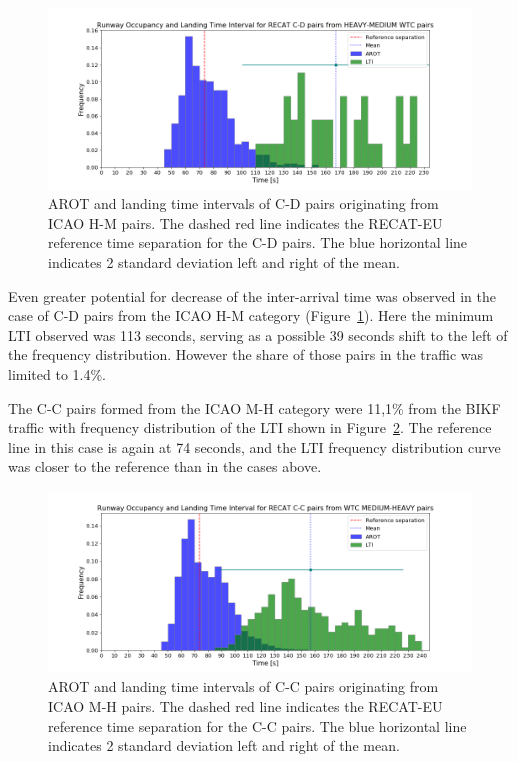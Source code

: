  \begin{figure}[h]
    \centering
    \includegraphics[width=1\textwidth]{graphics/fig_CD_from_HM_pairs_time_sep.png}
    \caption[AROT and LTI of C-D pairs originating from ICAO H-M pairs]{AROT and landing time intervals of C-D pairs originating from ICAO H-M pairs. The dashed red line indicates the RECAT-EU reference time separation for the C-D pairs. The blue horizontal line indicates 2 standard deviation left and right of the mean.}
    \label{fig:CD_from_HM_pairs_time_sep}
\end{figure}

Even greater potential for decrease of the inter-arrival time was observed in the case of C-D pairs from the ICAO H-M category (Figure~\ref{fig:CD_from_HM_pairs_time_sep}). Here the minimum LTI observed was 113 seconds, serving as a possible 39 seconds shift to the left of the frequency distribution. However the share of those pairs in the traffic was limited to 1.4\%.

The C-C pairs formed from the ICAO M-H category were 11,1\% from the BIKF traffic with frequency distribution of the LTI shown in Figure~\ref{fig:CC_from_MH_pairs_time_sep}. The reference line in this case is again at 74 seconds, and the LTI frequency distribution curve was closer to the reference than in the cases above.

\begin{figure}[h]
    \centering
    \includegraphics[width=1\textwidth]{graphics/fig_CC_from_MH_pairs_time_sep.png}
    \caption[AROT and LTI of C-C pairs originating from ICAO M-H pairs]{AROT and landing time intervals of C-C pairs originating from ICAO M-H pairs. The dashed red line indicates the RECAT-EU reference time separation for the C-C pairs. The blue horizontal line indicates 2 standard deviation left and right of the mean.}
    \label{fig:CC_from_MH_pairs_time_sep}
\end{figure}

